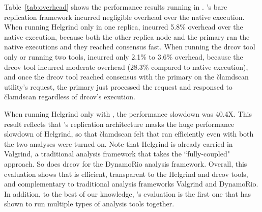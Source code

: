 Table~\ref{tab:overhead} shows the performance results running \clamav in 
\xxx. \xxx's bare replication framework incurred negligible overhead over 
the native execution. When running Helgrind only in one 
replica, \xxx incurred 5.8\% overhead over the native execution, because both 
the other replica node and the primary ran the native executions and they 
reached consensus fast. When running the drcov tool only or running two tools, 
\xxx incurred only 2.1\% to 3.6\% overhead, because the drcov tool incurred 
moderate overhead (28.3\% compared to native execution), and once the drcov 
tool reached consensus with the primary on the \v{clamdscan} utility's request, 
the primary just processed the request and responsed to \v{clamdscan} 
regardless of drcov's execution.

When running Helgrind only with \clamav, the performance slowdown was 40.4X. 
This result reflects that \xxx's replication architecture masks the huge 
performance slowdown of Helgrind, so that \v{clamdscan} felt that \clamav ran 
efficiently even with both the two analyses were turned on. Note that Helgrind 
is already carried in Valgrind, a traditional analysis framework that takes the 
``fully-coupled" approach. So does drcov for the DynamoRio analysis framework. 
Overall, this evaluation shows that \xxx is efficient, transparent to the 
Helgrind and drcov tools, and complementary to traditional analysis frameworks 
Valgrind and DynamoRio. In addition, to the best of our knowledge, \xxx's 
evaluation is the first one that has shown to run multiple types of analysis 
tools together.
